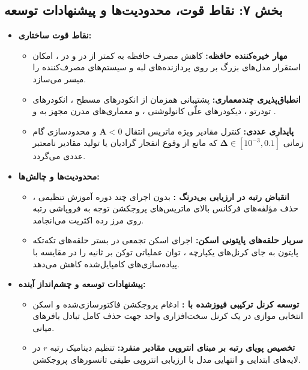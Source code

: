 \subsection*{بخش ۷: نقاط قوت، محدودیت‌ها و پیشنهادات توسعه }
\begin{itemize}
    \item \textbf{نقاط قوت ساختاری:}
    \begin{itemize}
        \item \textbf{مهار خیره‌کننده حافظه:} کاهش مصرف حافظه به کمتر از  در  و  در ، امکان استقرار مدل‌های بزرگ بر روی پردازنده‌های لبه و سیستم‌های مصرف‌کننده را میسر می‌سازد.
        \item \textbf{انطباق‌پذیری چندمعماری:} پشتیبانی همزمان از انکودرهای مسطح ، انکودرهای تودرتو ، دیکودرهای علّی کانولوشنی ، و معماری‌های مدرن مجهز به  و  .
        \item \textbf{پایداری عددی:} کنترل مقادیر ویژه ماتریس انتقال $\mathbf{A} < 0$ و محدودسازی گام زمانی $\mathbf{\Delta} \in [10^{-3}, 0.1]$ که مانع از وقوع انفجار گرادیان یا تولید مقادیر نامعتبر عددی  می‌گردد.
    \end{itemize}
    \item \textbf{محدودیت‌ها و چالش‌ها:}
    \begin{itemize}
        \item \textbf{انقباض رتبه در ارزیابی بی‌درنگ :} بدون اجرای چند دوره آموزش تنظیمی ، حذف مؤلفه‌های فرکانس بالای ماتریس‌های پروجکشن توجه به فروپاشی رتبه روی مرز رده اکثریت می‌انجامد.
        \item \textbf{سربار حلقه‌های پایتونی اسکن:} اجرای اسکن تجمعی در بستر حلقه‌های تکه‌تکه پایتون به جای کرنل‌های یکپارچه ، توان عملیاتی توکن بر ثانیه را در مقایسه با پیاده‌سازی‌های کامپایل‌شده کاهش می‌دهد.
    \end{itemize}
    \item \textbf{پیشنهادات توسعه و چشم‌انداز آینده:}
    \begin{itemize}
        \item \textbf{توسعه کرنل ترکیبی فیوزشده با :} ادغام پروجکشن فاکتورسازی‌شده  و اسکن انتخابی موازی  در یک کرنل سخت‌افزاری واحد جهت حذف کامل تبادل بافرهای میانی.
        \item \textbf{تخصیص پویای رتبه بر مبنای انتروپی مقادیر منفرد:} تنظیم دینامیک رتبه $r$ در لایه‌های ابتدایی و انتهایی مدل با ارزیابی انتروپی طیفی تانسورهای پروجکشن.
    \end{itemize}
\end{itemize}

